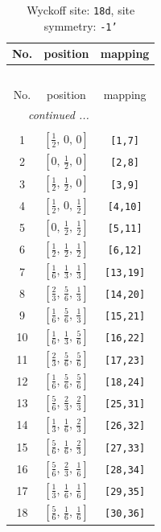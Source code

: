 \documentclass[fleqn,8pt]{jsarticle}
\begin{document}
\begin{longtable}{ccc}
\caption{Wyckoff site: {\tt 18d}, site symmetry: {\tt -1'}}
 \\
 \hline \hline
No. & position & mapping \\ \hline \endfirsthead

\multicolumn{2}{l}{\tablename\ \thetable{}} \\
 \hline \hline
No. & position & mapping \\ \hline \endhead

 \hline \hline
\multicolumn{2}{r}{\footnotesize\it continued ...} \\ \endfoot

 \hline \hline
\multicolumn{2}{r}{} \\ \endlastfoot

1 & $\left[ \frac{1}{2},\, 0,\, 0 \right]$ & {\tt [1,7]} \\ \hline
2 & $\left[ 0,\, \frac{1}{2},\, 0 \right]$ & {\tt [2,8]} \\ \hline
3 & $\left[ \frac{1}{2},\, \frac{1}{2},\, 0 \right]$ & {\tt [3,9]} \\ \hline
4 & $\left[ \frac{1}{2},\, 0,\, \frac{1}{2} \right]$ & {\tt [4,10]} \\ \hline
5 & $\left[ 0,\, \frac{1}{2},\, \frac{1}{2} \right]$ & {\tt [5,11]} \\ \hline
6 & $\left[ \frac{1}{2},\, \frac{1}{2},\, \frac{1}{2} \right]$ & {\tt [6,12]} \\ \hline
7 & $\left[ \frac{1}{6},\, \frac{1}{3},\, \frac{1}{3} \right]$ & {\tt [13,19]} \\ \hline
8 & $\left[ \frac{2}{3},\, \frac{5}{6},\, \frac{1}{3} \right]$ & {\tt [14,20]} \\ \hline
9 & $\left[ \frac{1}{6},\, \frac{5}{6},\, \frac{1}{3} \right]$ & {\tt [15,21]} \\ \hline
10 & $\left[ \frac{1}{6},\, \frac{1}{3},\, \frac{5}{6} \right]$ & {\tt [16,22]} \\ \hline
11 & $\left[ \frac{2}{3},\, \frac{5}{6},\, \frac{5}{6} \right]$ & {\tt [17,23]} \\ \hline
12 & $\left[ \frac{1}{6},\, \frac{5}{6},\, \frac{5}{6} \right]$ & {\tt [18,24]} \\ \hline
13 & $\left[ \frac{5}{6},\, \frac{2}{3},\, \frac{2}{3} \right]$ & {\tt [25,31]} \\ \hline
14 & $\left[ \frac{1}{3},\, \frac{1}{6},\, \frac{2}{3} \right]$ & {\tt [26,32]} \\ \hline
15 & $\left[ \frac{5}{6},\, \frac{1}{6},\, \frac{2}{3} \right]$ & {\tt [27,33]} \\ \hline
16 & $\left[ \frac{5}{6},\, \frac{2}{3},\, \frac{1}{6} \right]$ & {\tt [28,34]} \\ \hline
17 & $\left[ \frac{1}{3},\, \frac{1}{6},\, \frac{1}{6} \right]$ & {\tt [29,35]} \\ \hline
18 & $\left[ \frac{5}{6},\, \frac{1}{6},\, \frac{1}{6} \right]$ & {\tt [30,36]} \\
\end{longtable}
\end{document}
